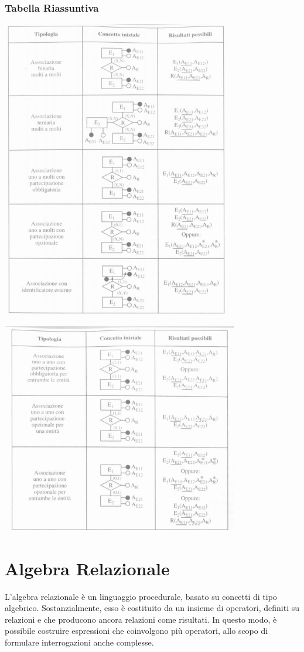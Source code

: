 \documentclass[a4paper,12pt, oneside]{book}
\begin{document}
\subsection{Tabella Riassuntiva}
\begin{center}
\includegraphics[scale=1]{img/tabrel.png}
\end{center}
\begin{center}
\includegraphics[scale=1]{img/tanrel2.png}
\end{center}
\chapter{Algebra Relazionale}
L'algebra relazionale è un linguaggio procedurale, basato
su concetti di tipo algebrico. Sostanzialmente, esso è costituito da un insieme di
operatori, definiti su relazioni e che producono ancora relazioni come risultati.
In questo modo, è possibile costruire espressioni che coinvolgono più operatori,
allo scopo di formulare interrogazioni anche complesse.
\end{document}
